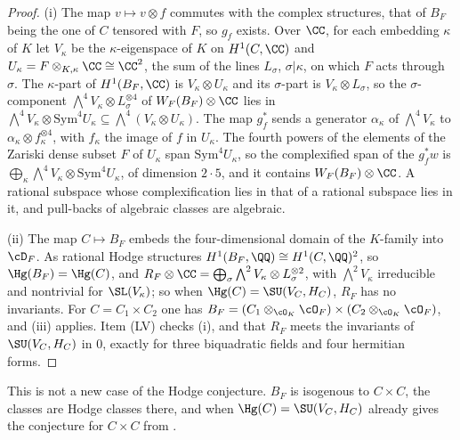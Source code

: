 \begin{proof}
(i) The map $v\mapsto v\otimes f$ commutes with the complex structures, that of
$B_{F}$ being the one of $C$ tensored with $F$, so $g_{f}$ exists. Over $\CC$,
for each embedding $\kappa$ of $K$ let $V_{\kappa}$ be the $\kappa$-eigenspace
of $K$ on $H^{1}(C,\CC)$ and $U_{\kappa}=F\otimes_{K,\kappa}\CC\cong\CC^{2}$, the
sum of the lines $L_{\sigma}$, $\sigma|\kappa$, on which $F$ acts through
$\sigma$. The $\kappa$-part of $H^{1}(B_{F},\CC)$ is $V_{\kappa}\otimes
U_{\kappa}$ and its $\sigma$-part is $V_{\kappa}\otimes L_{\sigma}$, so the
$\sigma$-component $\bigwedge^{4}V_{\kappa}\otimes L_{\sigma}^{\otimes4}$ of
$W_{F}(B_{F})\otimes\CC$ lies in $\bigwedge^{4}V_{\kappa}\otimes
\mathrm{Sym}^{4}U_{\kappa}\subseteq\bigwedge^{4}(V_{\kappa}\otimes U_{\kappa})$.
The map $g_{f}^{*}$ sends a generator $\alpha_{\kappa}$ of $\bigwedge^{4}V_{\kappa}$
to $\alpha_{\kappa}\otimes f_{\kappa}^{\otimes4}$, with $f_{\kappa}$ the image
of $f$ in $U_{\kappa}$. The fourth powers of the elements of the Zariski
dense subset $F$ of $U_{\kappa}$ span $\mathrm{Sym}^{4}U_{\kappa}$, so the
complexified span of the $g_{f}^{*}w$ is $\bigoplus_{\kappa}\bigwedge^{4}V_{\kappa}
\otimes\mathrm{Sym}^{4}U_{\kappa}$, of dimension $2\cdot5$, and it contains
$W_{F}(B_{F})\otimes\CC$. A rational subspace whose complexification lies in
that of a rational subspace lies in it, and pull-backs of algebraic classes
are algebraic.

(ii) The map $C\mapsto B_{F}$ embeds the four-dimensional domain of the
$K$-family into $\cD_{F}$. As rational Hodge structures
$H^{1}(B_{F},\QQ)\cong H^{1}(C,\QQ)^{2}$, so $\Hg(B_{F})=\Hg(C)$, and
$R_{F}\otimes\CC=\bigoplus_{\sigma}\bigwedge^{2}V_{\kappa}\otimes
L_{\sigma}^{\otimes2}$, with $\bigwedge^{2}V_{\kappa}$ irreducible and
nontrivial for $\SL(V_{\kappa})$; so when $\Hg(C)=\SU(V_{C},H_{C})$, $R_{F}$
has no invariants. For $C=C_{1}\times C_{2}$ one has
$B_{F}=(C_{1}\otimes_{\cO_{K}}\cO_{F})\times(C_{2}\otimes_{\cO_{K}}\cO_{F})$, and
(iii) applies. Item (LV) checks (i), and that $R_{F}$
meets the invariants of $\SU(V_{C},H_{C})$ in $0$, exactly for three
biquadratic fields and four hermitian forms.
\end{proof}

This is not a new case of the Hodge conjecture. $B_{F}$ is isogenous to
$C\times C$, the classes are Hodge classes there, and when
$\Hg(C)=\SU(V_{C},H_{C})$  already gives the conjecture for
$C\times C$ from \cite{Mar25a}.

